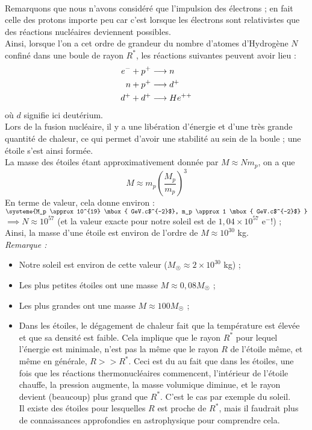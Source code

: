 \documentclass[../Notes de cours]{subfiles}
\begin{document}
\paragraph{} Remarquons que nous n'avons considéré que l'impulsion des électrons ; en fait celle des protons importe peu car c'est lorsque les électrons sont relativistes que des réactions nucléaires deviennent possibles. \\
Ainsi, lorsque l'on a cet ordre de grandeur du nombre d'atomes d'Hydrogène $N$ confiné dans une boule de rayon $R^*$, les réactions suivantes peuvent avoir lieu : 
\begin{align}
e^- + p^+ &\longrightarrow n \notag \\
n + p^+ &\longrightarrow d^+ \notag \\
d^+ + d^+ &\longrightarrow He^{++} \notag
\end{align}
où $d$ signifie ici deutérium. \\

Lors de la fusion nucléaire, il y a une libération d'énergie et d'une très grande quantité de chaleur, ce qui permet d'avoir une stabilité au sein de la boule ; une étoile s'est ainsi formée. \\ 

La masse des étoiles étant approximativement donnée par $ M \approx Nm_p$, on a que 
\begin{equation}
    M \approx m_p \left( \frac{M_p}{m_p} \right)^3
\end{equation}
En terme de valeur, cela donne environ : $\systeme{M_p \approx 10^{19} \mbox{ GeV.c$^{-2}$}, m_p \approx 1 \mbox{ GeV.c$^{-2}$} }$ $\implies  N \approx 10^{57}$ (et la valeur exacte pour notre soleil est de $1,04 \times 10^{57}$ e$^-$!) ; \\
Ainsi, la masse d'une étoile est environ de l'ordre de $M \approx 10^{30}$ kg. \\

\textit{Remarque :} \begin{itemize}[label = \textbullet]
    \item Notre soleil est environ de cette valeur ($M_{\astrosun} \approx 2 \times 10^{30}$ kg) ;
    \item Les plus petites étoiles ont une masse $M \approx 0,08 M_{\astrosun}$ ; 
    \item Les plus grandes ont une masse $M \approx 100 M_{\astrosun}$ ; 
    \item Dans les étoiles, le dégagement de chaleur fait que la température est élevée et que sa densité est faible. Cela implique que le rayon $R^*$ pour lequel l'énergie est minimale, n'est pas la même que le rayon $R$ de l'étoile même, et même en générale, $R >> R^*$. Ceci est du au fait que dans les étoiles, une fois que les réactions thermonucléaires commencent, l'intérieur de l'étoile chauffe, la pression augmente, la masse volumique diminue, et le rayon devient (beaucoup) plus grand que $R^*$. C'est le cas par exemple du soleil. \\
    Il existe des étoiles pour lesquelles $R$ est proche de $R^*$, mais il faudrait plus de connaissances approfondies en astrophysique pour comprendre cela. 
\end{itemize}
\end{document}
